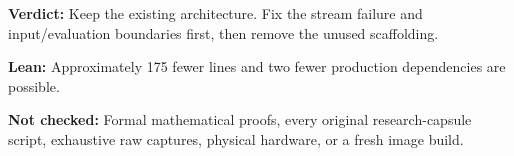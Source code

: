 \documentclass[11pt,a4paper]{article}
\begin{document}
\bigskip
\begin{samepage}
\textbf{Verdict:} Keep the existing architecture. Fix the stream failure and
input/evaluation boundaries first, then remove the unused scaffolding.

\textbf{Lean:} Approximately 175 fewer lines and two fewer production
dependencies are possible.

\textbf{Not checked:} Formal mathematical proofs, every original
research-capsule script, exhaustive raw captures, physical hardware,
or a fresh image build.
\end{samepage}
\end{document}
